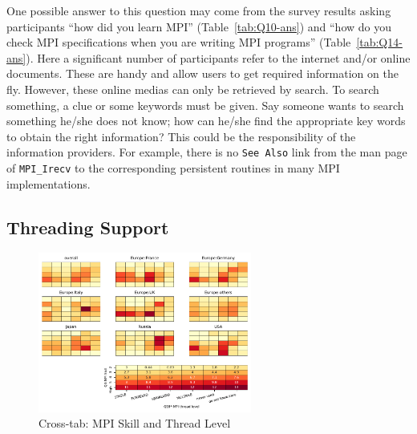 \documentclass[sigconf,nonacm]{acmart}
\begin{document}
One possible answer to this question may come from the survey results
asking participants ``how did you learn MPI''
(Table~\ref{tab:Q10-ans}) and ``how do you check
MPI specifications when you are writing MPI programs''
(Table~\ref{tab:Q14-ans}).
Here a significant number of participants refer to the internet
and/or online documents. These are handy and allow users to get
required information on the fly. However,
these online medias can only be retrieved by
search. To search something, a clue or some keywords must be given.
Say someone wants to search something he/she does not know; how can he/she
find the appropriate key words to obtain the right information?
This could be the responsibility of the information providers. For example,
there is no {\tt See Also} link from the man page of {\tt MPI\_Irecv}
to the corresponding persistent routines in many MPI implementations.


\subsection{Threading Support}

\begin{figure}[htb]
\begin{center}
\includegraphics[width=7cm]{figs/Q3-Q18.pdf}
\caption{Cross-tab: MPI Skill and Thread Level}%
\label{fig:Q3-Q18}
\end{center}
\end{figure}
\end{document}
